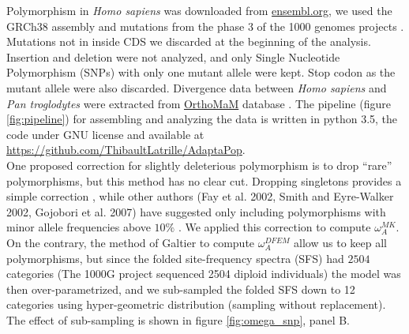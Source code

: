 \documentclass[10pt]{article}
\begin{document}
\begin{multicols}{2}
	Polymorphism in \textit{Homo sapiens} was downloaded from \href{http://www.ensembl.org/index.html}{ensembl.org}, we used the GRCh38 assembly and mutations from the phase 3 of the 1000 genomes projects \cite{consortium_integrated_2012, the_1000_genomes_project_consortium_global_2015}. Mutations not in inside CDS we discarded at the beginning of the analysis. Insertion and deletion were not analyzed, and only Single Nucleotide Polymorphism (SNPs) with only one mutant allele were kept. Stop codon as the mutant allele were also discarded. Divergence data between \textit{Homo sapiens} and \textit{Pan troglodytes} were extracted from \href{http://www.orthomam.univ-montp2.fr}{OrthoMaM} database \cite{ranwez_orthomam:_2007, douzery_orthomam_2014}. The pipeline (figure \ref{fig:pipeline}) for assembling and analyzing the data is written in python 3.5, the code under GNU license and available at \href{https://github.com/ThibaultLatrille/AdaptaPop}{https://github.com/ThibaultLatrille/AdaptaPop}. \\
	
	One proposed correction for slightly deleterious polymorphism is to drop “rare” polymorphisms, but this method has no clear cut. Dropping singletons provides a simple correction \cite{templeton_contingency_1996}, while other authors (Fay et al. 2002, Smith and Eyre-Walker 2002, Gojobori et al. 2007) have suggested only including polymorphisms with minor allele frequencies above $10\%$ \cite{smith_adaptive_2002, fay_testing_2002, gojobori_adaptive_2007}. We applied this correction to compute $\omega_A^{MK}$. On the contrary, the method of Galtier to compute $\omega_A^{DFEM}$ allow us to keep all polymorphisms, but since the folded site-frequency spectra (SFS) had $2504$ categories (The 1000G project sequenced 2504 diploid individuals) the model was then over-parametrized, and we sub-sampled the folded SFS down to 12 categories using hyper-geometric distribution (sampling without replacement). The effect of sub-sampling is shown in figure \ref{fig:omega_snp}, panel B.
	


\end{multicols}
\end{document}
